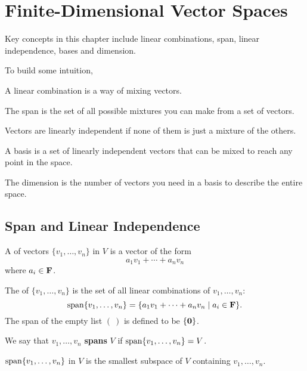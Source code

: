 \chapter{Finite-Dimensional Vector Spaces}\label{chap:finite-dim-vector-spaces}
Key concepts in this chapter include linear combinations, span, linear independence, bases and dimension.

To build some intuition,

\begin{mdframed}
A linear combination is a way of mixing vectors.

The span is the set of all possible mixtures you can make from a set of vectors.

Vectors are linearly independent if none of them is just a mixture of the others.

A basis is a set of linearly independent vectors that can be mixed to reach any point in the space.

The dimension is the number of vectors you need in a basis to describe the entire space.
\end{mdframed}

\section{Span and Linear Independence}
\begin{definition}
A  of vectors $\{v_1,\dots,v_n\}$ in $V$ is a vector of the form
\[a_1v_1+\cdots+a_nv_n\]
where $a_i\in\mathbf F$.
\end{definition}

\begin{definition}[Span]
The  of $\{v_1,\dots,v_n\}$ is the set of all linear combinations of $v_1,\dots,v_n$:
\[\operatorname{span}\{v_1,\dots,v_n\}=\{a_1v_1+\cdots+a_nv_n\mid a_i\in\mathbf F\}.\]
The span of the empty list $(\:)$ is defined to be $\{\vb{0}\}$.

We say that $v_1,\dots,v_n$ \textbf{spans} $V$ if $\operatorname{span}\{v_1,\dots,v_n\}=V$.
\end{definition}

\begin{proposition}
$\operatorname{span}\{v_1,\dots,v_n\}$ in $V$ is the smallest subspace of $V$ containing $v_1,\dots,v_n$.
\end{proposition}


